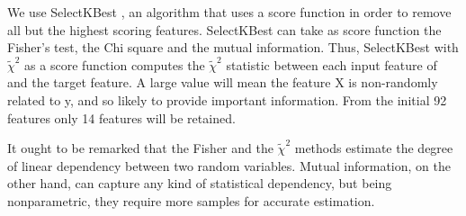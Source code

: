 \documentclass[preprint,12pt]{elsarticle}
\begin{document}
We use SelectKBest \cite{scikit-learn}, an algorithm that uses a score function in order to remove all but the highest scoring features. SelectKBest can take as score function the Fisher's test, the Chi square and the mutual information. 
Thus, SelectKBest with $\tilde{\chi}^2$ as a score function computes the  $\tilde{\chi}^2$ statistic between each input feature of and the target feature. A large value will mean the feature X is non-randomly related to y, and so likely to provide important information. From the initial 92 features only 14 features will be retained.

It ought to be remarked that the Fisher and the $\tilde{\chi}^2$ methods estimate the degree of linear dependency between two random variables. Mutual information, on the other hand, can capture any kind of statistical dependency, but being nonparametric, they require more samples for accurate estimation.
\end{document}
